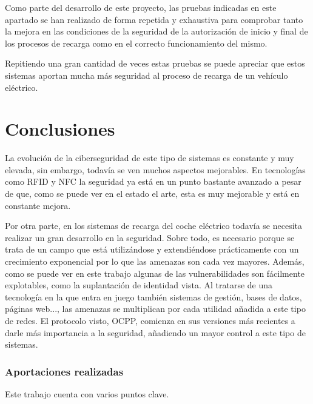 \documentclass[12pt,a4paper,onecolumn,oneside]{report}
\newcommand{\mychapter}[2]{
	\setcounter{chapter}{#1}
	\setcounter{section}{1}
	\chapter*{#2}
	\addcontentsline{toc}{chapter}{#2}
}
\begin{document}
Como parte del desarrollo de este proyecto, las pruebas indicadas en este apartado se han realizado de forma repetida y exhaustiva para comprobar tanto la mejora en las condiciones de la seguridad de la autorización de inicio y final de los procesos de recarga como en el correcto funcionamiento del mismo.

Repitiendo una gran cantidad de veces estas pruebas se puede apreciar que estos sistemas aportan mucha más seguridad al proceso de recarga de un vehículo eléctrico.

\mychapter{1}{Conclusiones}

La evolución de la ciberseguridad de este tipo de sistemas es constante y muy elevada, sin embargo, todavía se ven muchos aspectos mejorables.
En tecnologías como RFID y NFC la seguridad ya está en un punto bastante avanzado a pesar de que, como se puede ver en el estado el arte, esta es muy mejorable y está en constante mejora.

Por otra parte, en los sistemas de recarga del coche eléctrico todavía se necesita realizar un gran desarrollo en la seguridad. Sobre todo, es necesario porque se trata de un campo que está utilizándose y extendiéndose prácticamente con un crecimiento exponencial por lo que las amenazas son cada vez mayores. Además, como se puede ver en este trabajo algunas de las vulnerabilidades son fácilmente explotables, como la suplantación de identidad vista. Al tratarse de una tecnología en la que entra en juego también sistemas de gestión, bases de datos, páginas web..., las amenazas se multiplican por cada utilidad añadida a este tipo de redes. El protocolo visto, OCPP, comienza en sus versiones más recientes a darle más importancia a la seguridad, añadiendo un mayor control a este tipo de sistemas.


\subsection*{Aportaciones realizadas}

Este trabajo cuenta con varios puntos clave. 
\end{document}
